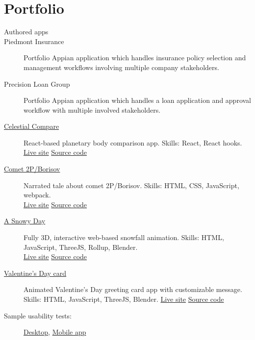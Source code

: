 \documentclass{article}
\begin{document}
\vspace{-0.5em}
\section*{Portfolio}\vspace{-0.5em}

\begin{description}
  \item[Authored apps]
  \item[Piedmont Insurance] Portfolio Appian application which handles insurance policy selection and management workflows involving multiple company stakeholders.
  \item[Precision Loan Group] Portfolio Appian application which handles a loan application and approval workflow with multiple involved stakeholders. 
  \item[\href{https://sirkoik.github.io/Celestial-Compare}{Celestial Compare}] React-based planetary body comparison app. Skills: React, React hooks.\\ \href{https://sirkoik.github.io/Celestial-Compare}{Live site} \textcolor{gray}{\textbullet} \href{https://github.com/sirkoik/Celestial-Compare}{Source code}
  \item[\href{https://sirkoik.github.io/BorisovXmas}{Comet 2P/Borisov}] Narrated tale about comet 2P/Borisov. Skills: HTML, CSS, JavaScript, webpack. \\ \href{https://sirkoik.github.io/BorisovXmas}{Live site} \textcolor{gray}{\textbullet} \href{https://github.com/sirkoik/BorisovXmas}{Source code}
  \item[\href{https://sirkoik.github.io/FallingObjects}{A Snowy Day}] Fully 3D, interactive web-based snowfall animation. Skills: HTML, JavaScript, ThreeJS, Rollup, Blender. \\
  \href{https://sirkoik.github.io/FallingObjects}{Live site} \textcolor{gray}{\textbullet} \href{https://github.com/sirkoik/FallingObjects}{Source code}
  \item[\href{https://sirkoik.github.io/February}{Valentine's Day card}] Animated Valentine's Day greeting card app with customizable message. \\
  Skills: HTML, JavaScript, ThreeJS, Blender. \href{https://sirkoik.github.io/February}{Live site} \textcolor{gray}{\textbullet} \href{https://github.com/sirkoik/February}{Source code}   
  \item[Sample usability tests:] \href{https://youtu.be/n0ts2tmBpzI}{Desktop}, \href{https://youtu.be/935ftL_X_rY}{Mobile app}
\end{description}
\end{document}
